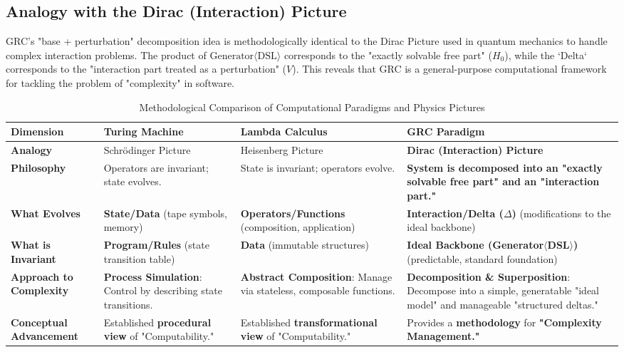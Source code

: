 \documentclass[11pt]{article}
\begin{document}
\subsection{Analogy with the Dirac (Interaction) Picture}

GRC's "base + perturbation" decomposition idea is methodologically identical to the Dirac Picture used in quantum mechanics to handle complex interaction problems. The product of $\text{Generator}\langle\text{DSL}\rangle$ corresponds to the "exactly solvable free part" ($H_0$), while the `Delta` corresponds to the "interaction part treated as a perturbation" ($V$). This reveals that GRC is a general-purpose computational framework for tackling the problem of "complexity" in software.

\begin{table}[htbp]
\centering
\caption{Methodological Comparison of Computational Paradigms and Physics Pictures}
\begin{tabularx}{\textwidth}{@{} l X X X @{}}
\toprule
\textbf{Dimension} & \textbf{Turing Machine} & \textbf{Lambda Calculus} & \textbf{GRC Paradigm} \\
\midrule
\textbf{Analogy} & Schrödinger Picture & Heisenberg Picture & \textbf{Dirac (Interaction) Picture} \\
\addlinespace
\textbf{Philosophy} & Operators are invariant; state evolves. & State is invariant; operators evolve. & \textbf{System is decomposed into an "exactly solvable free part" and an "interaction part."} \\
\addlinespace
\textbf{What Evolves} & \textbf{State/Data} (tape symbols, memory) & \textbf{Operators/Functions} (composition, application) & \textbf{Interaction/Delta ($\Delta$)} (modifications to the ideal backbone) \\
\addlinespace
\textbf{What is Invariant} & \textbf{Program/Rules} (state transition table) & \textbf{Data} (immutable structures) & \textbf{Ideal Backbone (Generator$\langle$DSL$\rangle$)} (predictable, standard foundation) \\
\addlinespace
\textbf{Approach to Complexity} & \textbf{Process Simulation}: Control by describing state transitions. & \textbf{Abstract Composition}: Manage via stateless, composable functions. & \textbf{Decomposition \& Superposition}: Decompose into a simple, generatable "ideal model" and manageable "structured deltas." \\
\addlinespace
\textbf{Conceptual Advancement} & Established \textbf{procedural view} of "Computability." & Established \textbf{transformational view} of "Computability." & Provides a \textbf{methodology} for \textbf{"Complexity Management."} \\
\bottomrule
\end{tabularx}
\label{tab:physics_analogy}
\end{table}
\end{document}
